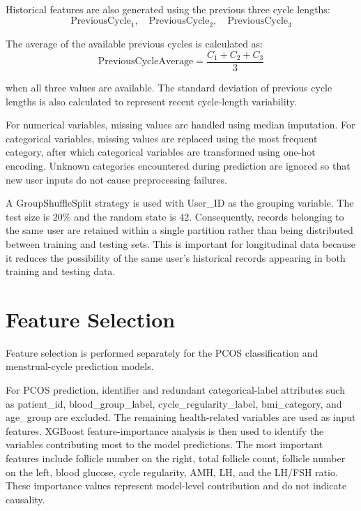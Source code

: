 Historical features are also generated using the previous three cycle lengths:
\[
\text{PreviousCycle}_1, \quad \text{PreviousCycle}_2, \quad \text{PreviousCycle}_3
\]

The average of the available previous cycles is calculated as:
\begin{equation}
    \text{PreviousCycleAverage} = \frac{C_1 + C_2 + C_3}{3}
\end{equation}

when all three values are available.
The standard deviation of previous cycle lengths is also calculated to represent recent cycle-length variability.

For numerical variables, missing values are handled using median imputation. For categorical variables, missing values are replaced using the most frequent category, after which categorical variables are transformed using one-hot encoding. Unknown categories encountered during prediction are ignored so that new user inputs do not cause preprocessing failures.

A GroupShuffleSplit strategy is used with User\_ID as the grouping variable. The test size is 20\% and the random state is 42. Consequently, records belonging to the same user are retained within a single partition rather than being distributed between training and testing sets. This is important for longitudinal data because it reduces the possibility of the same user's historical records appearing in both training and testing data.


\section{Feature Selection}
\label{sec:featselec}

Feature selection is performed separately for the PCOS classification and menstrual-cycle prediction models.

For PCOS prediction, identifier and redundant categorical-label attributes such as patient\_id, blood\_group\_label, cycle\_regularity\_label, bmi\_category, and age\_group are excluded. The remaining health-related variables are used as input features. XGBoost feature-importance analysis is then used to identify the variables contributing most to the model predictions. The most important features include follicle number on the right, total follicle count, follicle number on the left, blood glucose, cycle regularity, AMH, LH, and the LH/FSH ratio. \cite{zad2024} These importance values represent model-level contribution and do not indicate causality.

